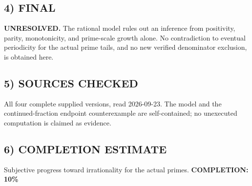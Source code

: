 \subsection*{4) FINAL}
\textbf{UNRESOLVED.} The rational model rules out an inference from positivity, parity, monotonicity, and prime-scale growth alone. No contradiction to eventual periodicity for the actual prime tails, and no new verified denominator exclusion, is obtained here.
\subsection*{5) SOURCES CHECKED}
All four complete supplied versions, read 2026-09-23. The model and the continued-fraction endpoint counterexample are self-contained; no unexecuted computation is claimed as evidence.
\subsection*{6) COMPLETION ESTIMATE}
Subjective progress toward irrationality for the actual primes.
\textbf{COMPLETION: 10\%}
